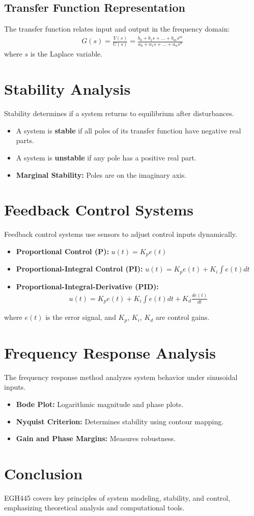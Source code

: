 \documentclass{article}
\begin{document}
\subsection{Transfer Function Representation}
The transfer function relates input and output in the frequency domain:
\begin{align*}
      G(s) = \frac{Y(s)}{U(s)} = \frac{b_0 + b_1s + \dots + b_m s^m}{a_0 + a_1s + \dots + a_n s^n}
\end{align*}
where $s$ is the Laplace variable.

\section{Stability Analysis}
Stability determines if a system returns to equilibrium after disturbances.
\begin{itemize}
      \item A system is \textbf{stable} if all poles of its transfer function have negative
            real parts.
      \item A system is \textbf{unstable} if any pole has a positive real part.
      \item \textbf{Marginal Stability:} Poles are on the imaginary axis.
\end{itemize}

\section{Feedback Control Systems}
Feedback control systems use sensors to adjust control inputs dynamically.
\begin{itemize}
      \item \textbf{Proportional Control (P):} $u(t) = K_p e(t)$
      \item \textbf{Proportional-Integral Control (PI):} $u(t) = K_p e(t) + K_i \int e(t) dt$
      \item \textbf{Proportional-Integral-Derivative (PID):}
            \begin{align*}
                  u(t) = K_p e(t) + K_i \int e(t) dt + K_d \frac{de(t)}{dt}
            \end{align*}
\end{itemize}
where $e(t)$ is the error signal, and $K_p$, $K_i$, $K_d$ are control gains.

\section{Frequency Response Analysis}
The frequency response method analyzes system behavior under sinusoidal inputs.
\begin{itemize}
      \item \textbf{Bode Plot:} Logarithmic magnitude and phase plots.
      \item \textbf{Nyquist Criterion:} Determines stability using contour mapping.
      \item \textbf{Gain and Phase Margins:} Measures robustness.
\end{itemize}

\section{Conclusion}
EGH445 covers key principles of system modeling, stability, and control,
emphasizing theoretical analysis and computational tools.
\end{document}
